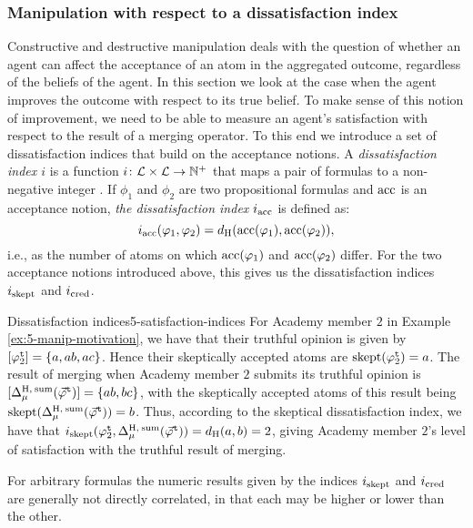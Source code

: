 \subsubsection{Manipulation with respect to a dissatisfaction index}
Constructive and destructive manipulation deals with the question 
of whether an agent can affect the acceptance of an atom in the aggregated outcome, 
regardless of the beliefs of the agent. 
In this section we look at the case when the agent improves 
the outcome with respect to its true belief.
To make sense of this notion of improvement,
we need to be able to measure an 
agent's satisfaction with respect 
to the result of a merging operator.
To this end we introduce a set of 
dissatisfaction indices that build on the acceptance notions. 
A \emph{dissatisfaction index $i$} 
is a function $i\colon\mathcal{L} \times \mathcal{L} \rightarrow \mathbb{N}^+$
that maps a pair of formulas to a non-negative integer \cite{EveraereKM07}. 
If $\phi_1$ and $\phi_2$ are two propositional formulas 
and ${\operatorname{acc}}$ is an acceptance notion, 
\emph{the dissatisfaction index $i_{\operatorname{acc}}$} is defined as:
$$
	i_{\operatorname{acc}}(\varphi_1,\varphi_2) = d_{{\operatorname{H}}}({\operatorname{acc}}(\varphi_1),{\operatorname{acc}}(\varphi_2)), 
$$
i.e., as the number of atoms on which ${\operatorname{acc}}(\varphi_1)$ and ${\operatorname{acc}}(\varphi_2)$ differ.
For the two acceptance notions introduced above, this gives us the 
dissatisfaction indices $i_{{\operatorname{skept}}}$ and $i_{{\operatorname{cred}}}$.

\begin{xmpl}{Dissatisfaction indices}{5-satisfaction-indices}
	For Academy member $2$ in Example \ref{ex:5-manip-motivation},
	we have that their truthful opinion is given by $[{\varphi}^{\mathtt{t}}_{2}]=\{a,ab,ac\}$.
	Hence their skeptically accepted atoms are ${\operatorname{skept}}({\varphi}^{\mathtt{t}}_{2})=a$.
	The result of merging when Academy member $2$ submits its truthful opinion
	is $[\Delta^{{\operatorname{H}},\:{\operatorname{sum}}}_{\mu}({{\vec{\varphi}}}^{\mathtt{t}})]=\{ab,bc\}$,
	with the skeptically accepted atoms of this result being 
	${\operatorname{skept}}(\Delta^{{\operatorname{H}},\:{\operatorname{sum}}}_{\mu}({{\vec{\varphi}}}^{\mathtt{t}}))=b$.
	Thus, according to the skeptical dissatisfaction index, we have that 
	$i_{{\operatorname{skept}}}({\varphi}^{\mathtt{t}}_2, \Delta^{{\operatorname{H}},\:{\operatorname{sum}}}_{\mu}({{\vec{\varphi}}}^{\mathtt{t}}))=d_{{\operatorname{H}}}(a,b)=2$,
	giving Academy member $2$'s level of satisfaction with the truthful 
	result of merging.
\end{xmpl}

For arbitrary formulas the numeric results given by the indices $i_{{\operatorname{skept}}}$ and $i_{{\operatorname{cred}}}$
are generally not directly correlated, in that each may be higher or lower than the other.

